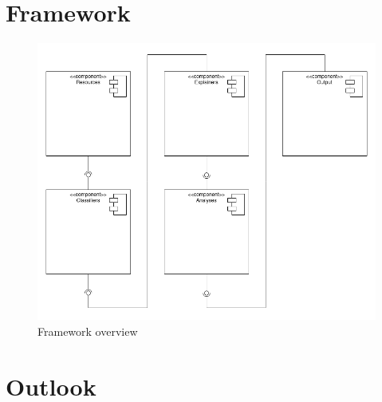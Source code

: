 \documentclass[en]{sdqbeamer}
\begin{document}
\begin{large}

\section{Framework}

\begin{frame}
    \begin{figure}[H]
            \centering
            \includegraphics[width=\linewidth,height=0.85\textheight,keepaspectratio]{images/Copy of Component_diagram_overview_framework_flatter.png}
            \caption{Framework overview}
    \end{figure}
\end{frame}



\section{Outlook}


\end{large}
\end{document}
